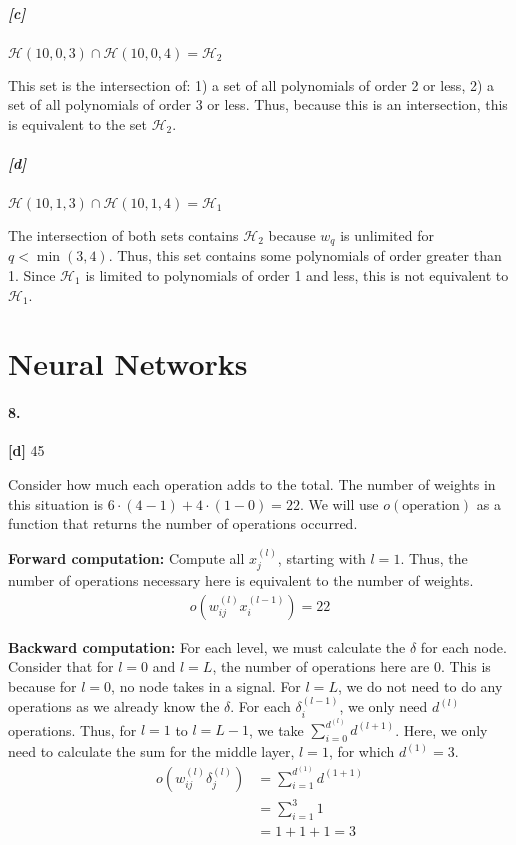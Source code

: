 \documentclass[10pt,letter]{article}
\begin{document}
\subparagraph{[c]} $\mathcal H(10,0,3) \cap \mathcal H(10,0,4) = \mathcal H_2$

	This set is the intersection of: 1) a set of all polynomials of order 2 or less, 2) a set of all polynomials of order 3 or less. Thus, because this is an intersection, this is equivalent to the set $\mathcal H_2$.

\subparagraph{[d]} $\mathcal H(10,1,3) \cap \mathcal H(10,1,4) = \mathcal H_1$

	The intersection of both sets contains $\mathcal H_2$ because $w_q$ is unlimited for $q < \min(3,4)$. Thus, this set contains some polynomials of order greater than 1. Since $\mathcal H_1$ is limited to polynomials of order 1 and less, this is not equivalent to $\mathcal H_1$.

\section*{Neural Networks}

\paragraph{8.} \textbf{[d]} 45

	Consider how much each operation adds to the total. The number of weights in this situation is $6\cdot(4-1)+4\cdot(1-0) = 22$. We will use $o(\text{operation})$ as a function that returns the number of operations occurred. 

	\textbf{Forward computation: } Compute all $x_j^{(l)}$, starting with $l = 1$. Thus, the number of operations necessary here is equivalent to the number of weights. 
	\begin{align*}
	o(w_{ij}^{(l)}x_i^{(l-1)}) = 22
	\end{align*}

	\textbf{Backward computation: } For each level, we must calculate the $\delta$ for each node. Consider that for $l = 0$ and $l = L$, the number of operations here are 0. This is because for $l=0$, no node takes in a signal. For $l = L$, we do not need to do any operations as we already know the $\delta$. For each $\delta_i^{(l-1)}$, we only need $d^{(l)}$ operations. Thus, for $l = 1$ to $l = L-1$, we take $\sum_{i=0}^{d^{(l)}} d^{(l+1)}$. Here, we only need to calculate the sum for the middle layer, $l = 1$, for which $d^{(1)} = 3$. 
	\begin{align*}
	o(w_{ij}^{(l)}\delta_j^{(l)}) &= \sum_{i=1}^{d^{(1)}} d^{(1+1)} \\
	&= \sum_{i=1}^{3} 1 \\
	&= 1 + 1 + 1 = 3 \\
	\end{align*}
\end{document}
